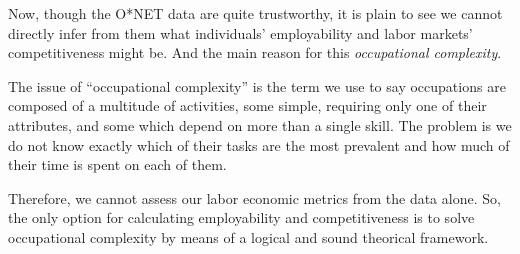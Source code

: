 \documentclass[hidelinks, nonatbib]{elsarticle}
\begin{document}
Now, though the O*NET data are quite trustworthy, it is plain to see we cannot directly infer from them what individuals' employability and labor markets' competitiveness might be. And the main reason for this \textit{occupational complexity}.

The issue of ``occupational complexity'' is the term we use to say occupations are composed of a multitude of activities, some simple, requiring only one of their attributes, and some which depend on more than a single skill. The problem is we do not know exactly which of their tasks are the most prevalent and how much of their time is spent on each of them.

Therefore, we cannot assess our labor economic metrics from the data alone. So, the only option for calculating employability and competitiveness is to solve occupational complexity by means of a logical and sound theorical framework.
\end{document}
